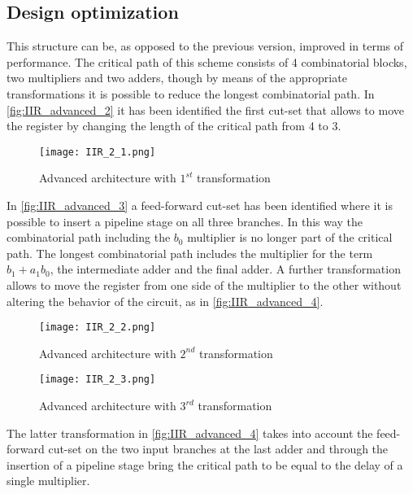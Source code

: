 \subsection{Design optimization}

This structure can be, as opposed to the previous version, improved in terms of performance. The critical path of this scheme consists of 4 combinatorial blocks, two multipliers and two adders, though by means of the appropriate transformations it is possible to reduce the longest combinatorial path.  In \autoref{fig:IIR_advanced_2} it has been identified the first cut-set that allows to move the register by changing the length of the critical path from 4 to 3.

\begin{figure}[htb]
	\center
	\texttt{[image: IIR\_2\_1.png]}
	\caption{Advanced architecture with $1^{st}$ transformation}
	\label{fig:IIR_advanced_2}
\end{figure}

In \autoref{fig:IIR_advanced_3} a feed-forward cut-set has been identified where it is possible to insert a pipeline stage on all three branches. In this way the combinatorial path including the $b_0$ multiplier is no longer part of the critical path. The longest combinatorial path includes the multiplier for the term $b_1 + a_1b_0$, the intermediate adder and the final adder. A further transformation allows to move the register from one side of the multiplier to the other without altering the behavior of the circuit, as in \autoref{fig:IIR_advanced_4}.

\begin{figure}[ht]
	\begin{minipage}[b]{0.5\linewidth}
		\centering
		\texttt{[image: IIR\_2\_2.png]}
		\caption{Advanced architecture with $2^{nd}$ transformation}
		\label{fig:IIR_advanced_3}
	\end{minipage}
	\hspace{0.5cm}
	\begin{minipage}[b]{0.5\linewidth}
		\centering
		\texttt{[image: IIR\_2\_3.png]}
		\caption{Advanced architecture with $3^{rd}$ transformation}
		\label{fig:IIR_advanced_4}
	\end{minipage}
\end{figure}

The latter transformation in \autoref{fig:IIR_advanced_4} takes into account the feed-forward cut-set on the two input branches at the last adder and through the insertion of a pipeline stage bring the critical path to be equal to the delay of a single multiplier.

